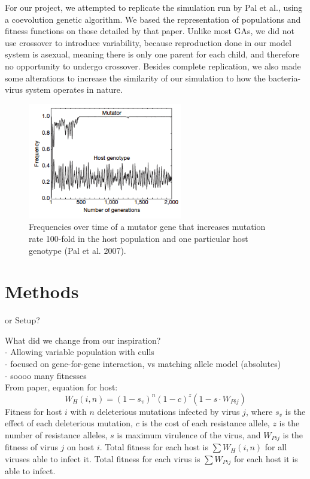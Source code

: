 \documentclass[11pt, oneside]{article}
\begin{document}
For our project, we attempted to replicate the simulation run by Pal et al., using a coevolution genetic algorithm. We based the representation of populations and fitness functions on those detailed by that paper. Unlike most GAs, we did not use crossover to introduce variability, because reproduction done in our model system is asexual, meaning there is only one parent for each child, and therefore no opportunity to undergo crossover. Besides complete replication, we also made some alterations to increase the similarity of our simulation to how the bacteria-virus system operates in nature. 

\begin{figure}[H]
	\centering
	\includegraphics[width=0.6\textwidth]{figure2.png}
	\caption{Frequencies over time of a mutator gene that increases mutation rate 100-fold in the host 			population and one particular host genotype (Pal et al. 2007).}
\end{figure}

\section{Methods}
or Setup? 

What did we change from our inspiration?
\\- Allowing variable population with culls
\\- focused on gene-for-gene interaction, vs matching allele model (absolutes)
\\- soooo many fitnesses\\From paper, equation for host:
\begin{equation}
W_{H}(i,n) = (1-s_{v})^n(1-c)^z(1-s\cdot W_{Pij})
\end{equation}
Fitness for host $i$ with $n$ deleterious mutations infected by virus $j$, where $s_{v}$ is the effect of each deleterious mutation, $c$ is the cost of each resistance allele, $z$ is the number of resistance alleles, $s$ is maximum virulence of the virus, and $W_{Pij}$ is the fitness of virus $j$ on host $i$. Total fitness for each host is $\sum W_{H}(i,n)$ for all viruses able to infect it. Total fitness for each virus is $\sum W_{Pij}$ for each host it is able to infect. 
\end{document}

